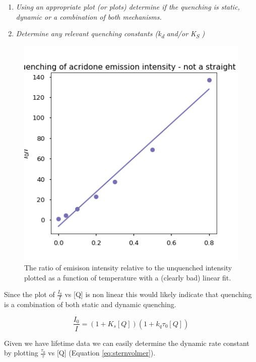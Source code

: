 \documentclass[
]{book}
\begin{document}
\begin{enumerate}
\def\labelenumi{\arabic{enumi}.}
\item
  \emph{Using an appropriate plot (or plots) determine if the quenching is static, dynamic or a combination of both mechanisms.}
\item
  \emph{Determine any relevant quenching constants (k\textsubscript{d} and/or K\textsubscript{S} )}
\end{enumerate}

\begin{figure}

{\centering \includegraphics[width=0.7\linewidth]{images/acridonequenchI0I} 

}

\caption{The ratio of emisison intensity  relative to the unquenched intensity plotted as a function of temperature with a (clearly bad) linear fit.}\label{fig:acridoneI0I}
\end{figure}

Since the plot of \(\frac{I_0}{I}\) vs {[}Q{]} is non linear this would likely indicate that quenching is a combination of both static and dynamic quenching.

\begin{equation*}
\frac{I_0}{I}=(1 + K_s [Q])(1 + k_q \tau _0 [Q])
\end{equation*}

Given we have lifetime data we can easily determine the dynamic rate constant by plotting \(\frac{\tau_0}{\tau}\) vs {[}Q{]} (Equation \eqref{eq:sternvolmer}).
\end{document}
